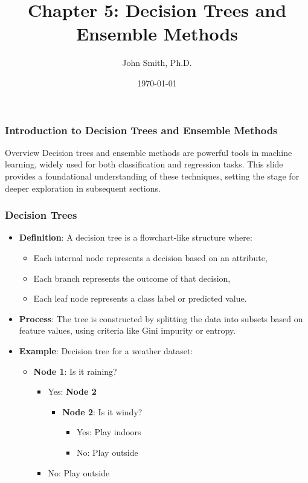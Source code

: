 \documentclass[aspectratio=169]{beamer}
\title[Chapter 5: Decision Trees and Ensemble Methods]{Chapter 5: Decision Trees and Ensemble Methods}
\author[J. Smith]{John Smith, Ph.D.}
\institute[University Name]{
    Department of Computer Science\\
    University Name\\
    \vspace{0.3cm}
    Email: email@university.edu\\
    Website: www.university.edu
}
\date{\today}
\begin{document}
\frame{\titlepage}

\begin{frame}[fragile]
    \frametitle{Introduction to Decision Trees and Ensemble Methods}
    \begin{block}{Overview}
        Decision trees and ensemble methods are powerful tools in machine learning, widely used for both classification and regression tasks. 
        This slide provides a foundational understanding of these techniques, setting the stage for deeper exploration in subsequent sections.
    \end{block}
\end{frame}

\begin{frame}[fragile]
    \frametitle{Decision Trees}
    \begin{itemize}
        \item \textbf{Definition}: A decision tree is a flowchart-like structure where:
        \begin{itemize}
            \item Each internal node represents a decision based on an attribute,
            \item Each branch represents the outcome of that decision,
            \item Each leaf node represents a class label or predicted value.
        \end{itemize}
        
        \item \textbf{Process}: The tree is constructed by splitting the data into subsets based on feature values, using criteria like Gini impurity or entropy.
        
        \item \textbf{Example}: Decision tree for a weather dataset:
        \begin{itemize}
            \item \textbf{Node 1}: Is it raining?
            \begin{itemize}
                \item Yes: \textbf{Node 2}
                \begin{itemize}
                    \item \textbf{Node 2}: Is it windy?
                    \begin{itemize}
                        \item Yes: Play indoors
                        \item No: Play outside
                    \end{itemize}
                \end{itemize}
                \item No: Play outside
            \end{itemize}
        \end{itemize}
    \end{itemize}
\end{frame}
\end{document}
